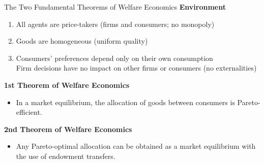 \documentclass[handout]{beamer}
\newenvironment{iPar}[1]{\textbf{#1} \begin{itemize}}{\end{itemize}}
\newcommand{\mdp}{\medskip \pause}
\begin{document}
\begin{frame}{The Two Fundamental Theorems of Welfare Economics}
\textbf{Environment} \begin{enumerate} \item All agents are price-takers (firms and consumers; no monopoly) \item Goods are homogeneous (uniform quality) \item Consumers' preferences depend only on their own consumption\\  Firm decisions have no impact on other firms or consumers (no externalities) 
\end{enumerate}

\begin{iPar}{1st Theorem of Welfare Economics} \item In a market equilibrium, the allocation of goods between consumers is Pareto-efficient. 
\end{iPar}\mdp

\begin{iPar}{2nd Theorem of Welfare Economics} \item Any Pareto-optimal allocation can be obtained as a market equilibrium with the use of endowment transfers.  
\end{iPar}\mdp
\end{frame}
\end{document}
